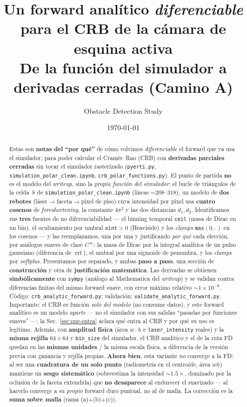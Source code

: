 \documentclass[11pt,a4paper]{article}
\title{Un forward anal\'itico \emph{diferenciable} para el CRB de la
c\'amara de esquina activa\\[4pt]
\large De la \textbf{funci\'on del simulador} a derivadas cerradas (Camino A)}
\author{Obstacle Detection Study}
\date{\today}
\theoremstyle{plain}
\theoremstyle{definition}
\newcommand{\erf}{\operatorname{erf}}
\begin{document}
\maketitle

\begin{abstract}
Estas son \textbf{notas del ``por qu\'e''} de c\'omo volvimos
\emph{diferenciable} el forward que ya usa el simulador, para poder calcular el
Cram\'er--Rao (CRB) con \textbf{derivadas parciales cerradas} sin tocar el
simulador rasterizado (\texttt{pyerti.py},
\texttt{simulation\_polar\_clean.ipynb}, \texttt{crb\_polar\_functions.py}).
El punto de partida \textbf{no} es el modelo del \emph{writeup}, sino la
\emph{propia funci\'on del simulador}: el bucle de tri\'angulos de la celda~8 de
\texttt{simulation\_polar\_clean.ipynb} (l\'ineas $\sim$208--318), un modelo de
\textbf{dos rebotes} (l\'aser$\to$faceta$\to$p\'ixel de piso) cuya intensidad por
p\'ixel usa \textbf{cuatro cosenos} de \emph{foreshortening}, la constante
$4\pi^2$ y las dos distancias $d_1,d_2$. Identificamos sus \textbf{tres} fuentes
de no diferenciabilidad --- el binning temporal \texttt{ceil} (masa de Dirac en
un bin), el ocultamiento por umbral \texttt{xint}$>0$ (Heaviside) y los
\emph{clamps} \texttt{max}$(0,\cdot)$ en los cosenos --- y las reemplazamos, una
por una y justificando \emph{por qu\'e} cada elecci\'on, por an\'alogos suaves de
clase $C^\infty$: la masa de Dirac por la integral anal\'itica de un pulso
gaussiano (diferencia de $\erf$), el umbral por una sigmoide de penumbra, y los
\emph{clamps} por \emph{softplus}. Presentamos por separado, y ambas
\textbf{paso a paso}, una secci\'on de \textbf{construcci\'on} y otra de
\textbf{justificaci\'on matem\'atica}. Las derivadas se obtienen
\textbf{simb\'olicamente} con \texttt{sympy} (an\'alogo al Mathematica del
\emph{writeup}) y se validan contra diferencias finitas del mismo forward suave,
con error m\'aximo relativo $\sim\!1\times10^{-9}$. C\'odigo:
\texttt{crb\_analytic\_forward.py}; validaci\'on:
\texttt{validate\_analytic\_forward.py}. Importante: el CRB es funci\'on
\emph{solo del modelo} (no consume datos), y este forward anal\'itico es un
modelo \emph{aparte} --- no el simulador con sus salidas ``pasadas por funciones
suaves'' ---; la Sec.~\ref{sec:que-entra} aclara qu\'e entra al CRB y por qu\'e su
uso es leg\'itimo. Adem\'as, con \textbf{amplitud f\'isica} (\'area
$w\!\cdot\!h$ e \texttt{laser\_intensity} reales) y la \textbf{misma rejilla}
$64\times64$ y \texttt{bin\_size} del simulador, el CRB anal\'itico y el de la
ruta FD quedan en las \textbf{mismas unidades} / la misma escala f\'isica, a
diferencia de la versi\'on previa con ganancia y rejilla propias. \textbf{Ahora
bien}, esta variante \emph{no} converge a la FD: al ser una \textbf{cuadratura de
un solo punto} (radiometr\'ia en el centroide, \'area $w h$) mantiene un
\textbf{sesgo sistem\'atico} (sobreestima la intensidad $\sim1.5\times$, dominado
por la oclusi\'on de la faceta extendida) que \textbf{no desaparece} al endurecer
el suavizado --- al hacerlo converge a su \emph{propio} forward duro puntual, no
al de malla. La correcci\'on es la \textbf{suma sobre malla} (rama (a)+(b)+(c)).
\end{abstract}
\end{document}
